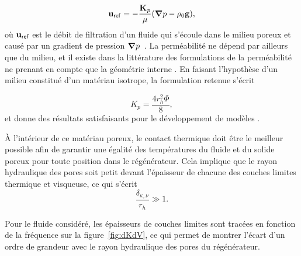 \begin{equation}
	\mathbf u_{\sf ref} = -\frac{\mathbf K_p}{\mu} (\bm{\nabla} p - \rho_0 \mathbf g),
	\label{eq:DefPermeabilite_Wikipedia}
\end{equation}
où $\mathbf u_{\sf ref}$ est le débit de filtration d'un fluide qui s'écoule dans le milieu poreux et causé par un gradient de pression $\bm{\nabla} p$~\cite{nield_convection_2013, dullien_porous_1992}. La perméabilité ne dépend par ailleurs que du milieu, et il existe dans la littérature des formulations de la perméabilité ne prenant en compte que la géométrie interne \cite{dullien_porous_1992}. En faisant l'hypothèse d'un milieu constitué d'un matériau isotrope, la formulation retenue s'écrit

\begin{equation}
	K_p = \frac{4 r_h^2 \Phi}{8},
	\label{eq:DefPermeabilite_LISN}
\end{equation}
et donne des résultats satisfaisants pour le développement de modèles \cite{hireche_experimental_2020, baltean_gravity_2025}.\smallskip


À l'intérieur de ce matériau poreux, le contact thermique doit être le meilleur possible afin de garantir une égalité des températures du fluide et du solide poreux pour toute position dans le régénérateur. Cela implique que le rayon hydraulique des pores soit petit devant l'épaisseur de chacune des couches limites thermique et visqueuse, ce qui s'écrit
\begin{equation}
	\frac{\delta_{\kappa,\nu}}{r_h} \gg 1.
	\label{eq:ConditionIso_dkdv}
\end{equation}

Pour le fluide considéré, les épaisseurs de couches limites sont tracées en fonction de la fréquence sur la figure~\ref{fig:dKdV}, ce qui permet de montrer l'écart d'un ordre de grandeur avec le rayon hydraulique des pores du régénérateur.

